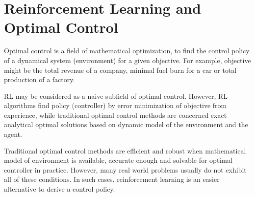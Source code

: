 \section{Reinforcement Learning and Optimal Control}
\label{sec:rl_and_control}

Optimal control is a field of mathematical optimization, to find the control policy of a dynamical system (environment) for a given objective. 
For example, objective might be the total revenue of a company, 
minimal fuel burn for a car or total production of a factory. 

RL may be considered as a naive subfield of optimal control. 
However, RL algorithms find policy (controller) by error minimization of objective from experience, 
while traditional optimal control methods are concerned exact analytical optimal solutions based on dynamic model of the environment and the agent. 

Traditional optimal control methods are efficient and robust when mathematical model of environment is available, 
accurate enough and solvable for optimal controller in practice. 
However, many real world problems usually do not exhibit all of these conditions. 
In such cases, reinforcement learning is an easier alternative to derive a control policy.

